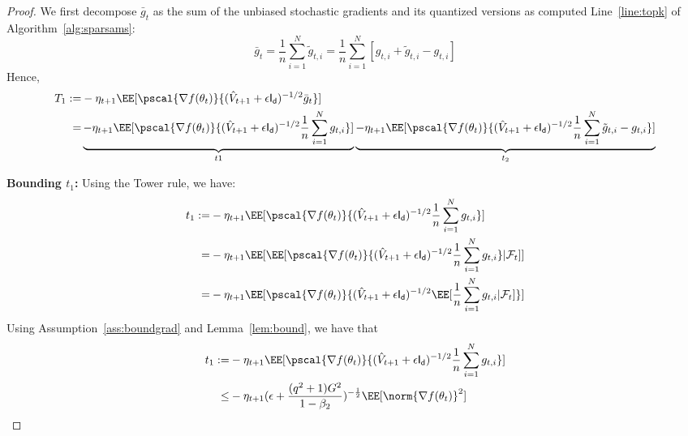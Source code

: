 \documentclass[11pt]{article}
\begin{document}
\begin{proof}
We first decompose $\bar{g}_t$  as the sum of the unbiased stochastic gradients and its quantized versions as computed Line~\ref{line:topk} of Algorithm~\ref{alg:sparsams}:
\begin{equation}
\bar{g}_t = \frac{1}{n}\sum_{i=1}^N \tilde g_{t,i} = \frac{1}{n}\sum_{i=1}^N [ g_{t,i} + \tilde g_{t,i} - g_{t,i}]
\end{equation}
Hence,
\begin{equation}
\begin{split}
T_1 := & -\eta_{t+1}\EE[\pscal{\nabla f(\theta_t)}{(\hat{V}_{t+1} + \epsilon \mathsf{I_d})^{-1/2} \bar{g}_t}] \\
=  &\underbrace{ -\eta_{t+1}\EE[\pscal{\nabla f(\theta_t)}{(\hat{V}_{t+1} + \epsilon \mathsf{I_d})^{-1/2} \frac{1}{n}\sum_{i=1}^N  g_{t,i}} ]}_{t1} \underbrace{-\eta_{t+1}\EE[\pscal{\nabla f(\theta_t)}{(\hat{V}_{t+1} + \epsilon \mathsf{I_d})^{-1/2} \frac{1}{n}\sum_{i=1}^N  \tilde g_{t,i} - g_{t,i}}]}_{t_2}
\end{split}
\end{equation}

\textbf{Bounding $t_1$:}
Using the Tower rule, we have:
\begin{equation}
\begin{split}
t_1 := &  -\eta_{t+1}\EE[\pscal{\nabla f(\theta_t)}{(\hat{V}_{t+1} + \epsilon \mathsf{I_d})^{-1/2} \frac{1}{n}\sum_{i=1}^N  g_{t,i}} ] \\
=  & -\eta_{t+1}\EE[\EE[\pscal{\nabla f(\theta_t)}{(\hat{V}_{t+1} + \epsilon \mathsf{I_d})^{-1/2} \frac{1}{n}\sum_{i=1}^N  g_{t,i}} | \mathcal{F}_t]] \\
=  & -\eta_{t+1}\EE[\pscal{\nabla f(\theta_t)}{(\hat{V}_{t+1} + \epsilon \mathsf{I_d})^{-1/2}\EE[ \frac{1}{n}\sum_{i=1}^N  g_{t,i}| \mathcal{F}_t]} ] 
\end{split}
\end{equation}
Using Assumption~\ref{ass:boundgrad} and Lemma~\ref{lem:bound}, we have that 
\begin{equation}\label{eq:lem2eq1}
\begin{split}
t_1 := &  -\eta_{t+1}\EE[\pscal{\nabla f(\theta_t)}{(\hat{V}_{t+1} + \epsilon \mathsf{I_d})^{-1/2} \frac{1}{n}\sum_{i=1}^N  g_{t,i}} ] \\
\leq & - \eta_{t+1} (\epsilon + \frac{(q^2+1)G^2}{1 - \beta_2})^{-\frac{1}{2}} \EE[\norm{\nabla f(\theta_t)}^2] 
 \end{split}
\end{equation}



\end{proof}
\end{document}
